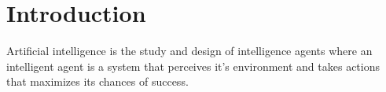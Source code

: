 \section{Introduction}

Artificial intelligence is the study and design of intelligence agents
where an intelligent agent is a system that perceives it's environment and
takes actions that maximizes its chances of success.
